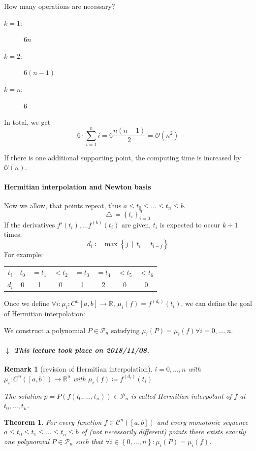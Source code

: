 \documentclass[a4paper]{article}
\newcounter{lecref}[section]
\numberwithin{lecref}{section}
\theoremstyle{break}
\newtheorem{thm}[lecref]{Theorem}
\newtheorem*{Remark}{Remark}
\newcommand{\dateref}[1]{%
  \begin{mdframed}[backgroundcolor=gray!10,innerbottommargin=0pt,innertopmargin=0pt]
    \paragraph{\textit{$\downarrow$ This lecture took place on #1.}}%
  \end{mdframed}%
}
\newcommand{\Set}[1]{\left\{#1\right\}}
\newcommand{\SetDef}[2]{\left\{#1\,\mid\,#2\right\}}
\begin{document}
How many operations are necessary?
\begin{description}
  \item[$k = 1$:]  $6n$
  \item[$k = 2$:]  $6(n - 1)$
  \item[$k = n$:]  $6$
\end{description}
In total, we get
\[ 6 \cdot \sum_{i=1}^n i = 6 \frac{n (n - 1)}{2} = \mathcal{O}(n^2) \]

If there is one additional supporting point, the computing time is increased by $\mathcal O(n)$.

\paragraph{Hermitian interpolation and Newton basis}

Now we allow, that points repeat, thus $a \leq t_0 \leq \dots \leq t_n \leq b$.
\[ \triangle \coloneqq \Set{t_i}_{i=0}^n \]
If the derivatives $f'(t_i), \dots f^{(k)}(t_i)$ are given,
$t_i$ is expected to occur $k+1$ times.
\[ d_i \coloneqq \max\SetDef{j}{t_i = t_{i-j}} \]
For example:
\begin{center}
  \begin{tabular}{c|ccccccc}
    $t_i$ & $t_0$ & $= t_1$ & $< t_2$ & $= t_3$ & $= t_4$ & $< t_5$ & $< t_6$ \\
    $d_i$ & 0 & 1 & 0 & 1 & 2 & 0 & 0
  \end{tabular}
\end{center}
Once we define $\forall i: \mu_i: C^n[a,b] \to \mathbb R$, $\mu_i(f) = f^{(d_i)}(t_i)$,
we can define the goal of Hermitian interpolation:

We construct a polynomial $P \in \mathcal P_n$ satisfying $\mu_i(P) = \mu_i(f) \forall i = 0, \dots, n$.

\dateref{2018/11/08}

\begin{Remark}[revision of Hermitian interpolation]
  $i = 0, \dots, n$ with $\mu_i: C^n([a,b]) \to \mathbb R^n$ with $\mu_i(f) \coloneqq f^{(d_i)}(t_i)$

  The solution $p = P(f(t_0, \dots, t_n)) \in \mathcal P_n$ is called \emph{Hermitian interpolant} of $f$ at $t_0, \dots, t_n$.
\end{Remark}

\begin{thm}
  \label{theorem:4-7}
  For every function $f \in \mathcal C^n([a,b])$ and every monotonic sequence $a \leq t_0 \leq t_1 \leq \dots \leq t_n \leq b$
  of (not necessarily different) points there exists exactly one polynomial $P \in \mathcal P_n$ such that $\forall i \in \Set{0, \dots, n}: \mu_i(P) = \mu_i(f)$.
\end{thm}
\end{document}
